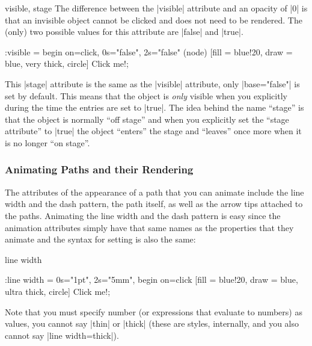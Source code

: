 \begin{tikzanimateattribute}{visible, stage}
    The difference between the |visible| attribute and an opacity of |0| is
    that an invisible object cannot be clicked and does not need to be
    rendered. The (only) two possible values for this attribute are |false| and
    |true|.
\begin{codeexample}[imagesource={standalone/pgfmanual-en-tikz-animations-animation-25.svg}]
\tikz :visible = {begin on=click, 0s="false", 2s="false"}
  \node (node) [fill = blue!20, draw = blue, very thick, circle] {Click me!};
\end{codeexample}

    This |stage| attribute is the same as the |visible| attribute, only
    |base="false"| is set by default. This means that the object is \emph{only}
    visible when you explicitly during the time the entries are set to |true|.
    The idea behind the name ``stage'' is that the object is normally ``off
    stage'' and when you explicitly set the ``stage attribute'' to |true| the
    object ``enters'' the stage and ``leaves'' once more when it is no longer
    ``on stage''.
\begin{codeexample}[imagesource={standalone/pgfmanual-en-tikz-animations-animation-26.svg}]
\end{codeexample}
\end{tikzanimateattribute}


\subsubsection{Animating Paths and their Rendering}
\label{section-animation-paths}

The attributes of the appearance of a path that you can animate include the
line width and the dash pattern, the path itself, as well as the arrow tips
attached to the paths. Animating the line width and the dash pattern is easy
since the animation attributes simply have that same names as the properties
that they animate and the syntax for setting is also the same:

\begin{tikzanimateattribute}{line width}
\begin{codeexample}[imagesource={standalone/pgfmanual-en-tikz-animations-animation-27.svg}]
\tikz \node :line width = { 0s="1pt", 2s="5mm", begin on=click}
  [fill = blue!20, draw = blue, ultra thick, circle] {Click me!};
\end{codeexample}
    Note that you must specify number (or expressions that evaluate to numbers)
    as values, you cannot say |thin| or |thick| (these are styles, internally,
    and you also cannot say |line width=thick|).
\end{tikzanimateattribute}

